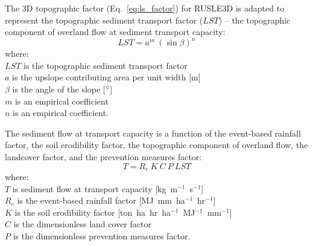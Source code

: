\documentclass[gmd, manuscript]{copernicus}
\begin{document}
The 3D topographic factor (Eq.~\ref{eq:ls_factor}) 
for RUSLE3D is adapted to represent 
the topographic sediment transport factor ($LST$) --
the topographic component 
of overland flow at sediment transport capacity:
%
\begin{equation}
\label{eq:lst_factor}
{LST = a^{m} ~ (\sin \beta)^{n}}
\end{equation}
%
{\small
\noindent
where: \\
\noindent
\hspace*{0.5em} $LST$ is the topographic sediment transport factor\\
\hspace*{0.5em} $a$ is the upslope contributing area per unit width [m]\\
\hspace*{0.5em} $\beta$ is the angle of the slope [$^{\circ}$]\\
\hspace*{0.5em} $m$ is an empirical coefficient\\
\hspace*{0.5em} $n$ is an empirical coefficient.\\
}

\noindent
The sediment flow at transport capacity is a function of 
the event-based rainfall factor, the soil erodibility factor, 
the topographic component of overland flow,
the landcover factor, and the prevention measures factor:
%
\begin{equation}
\label{eq:usped}
{T = R_e ~ K ~ C ~ P ~ LST}
\end{equation}
{\small
\noindent
where: \\
\noindent
\hspace*{0.5em} $T$ is sediment flow at transport capacity [\unit{kg~m}$^{-1}$~\unit{s}$^{-1}$]\\ 
\hspace*{0.5em} $R_e$ is the event-based rainfall factor [\unit{MJ~mm~ha}$^{-1}$~\unit{hr}$^{-1}$]\\
\hspace*{0.5em} $K$ is the soil erodibility factor [\unit{ton~ha~hr~ha}$^{-1}$~\unit{MJ}$^{-1}$~\unit{mm}$^{-1}$]\\ 
\hspace*{0.5em} $C$ is the dimensionless land cover factor\\
\hspace*{0.5em} $P$ is the dimensionless prevention measures factor.\\
}
\end{document}
